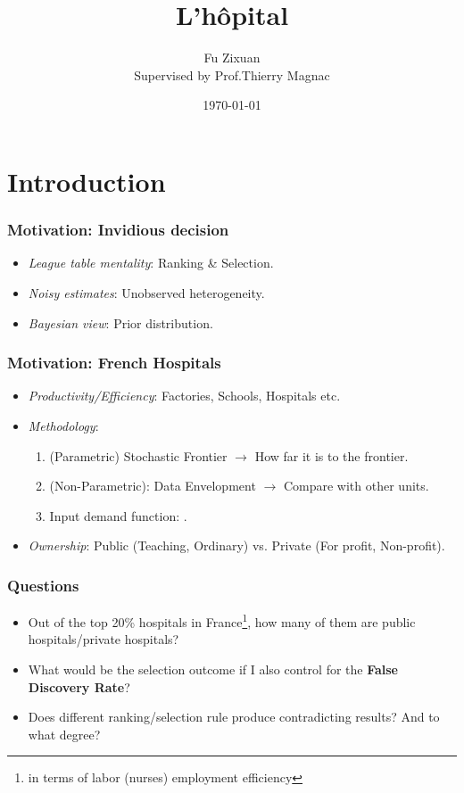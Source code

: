 \documentclass[10pt,mathserif]{beamer}
\title{\large \bfseries L'hôpital}
\author{Fu Zixuan\\[3ex]
  Supervised by Prof.Thierry Magnac}
\date{\today}
\begin{document}
\frame{
  \thispagestyle{empty}
  \titlepage
}

\section{Introduction}

\begin{frame}
  \frametitle{Motivation: Invidious decision}
  \begin{itemize}\itemsep=12pt
    \item \textit{League table mentality}: Ranking \& Selection.
    \item \textit{Noisy estimates}: Unobserved heterogeneity.
    \item \textit{Bayesian view}: Prior distribution.
  \end{itemize}
\end{frame}

\begin{frame}
  \frametitle{Motivation: French Hospitals}
  \begin{itemize}\itemsep=12pt
    \item \textit{Productivity/Efficiency}: Factories, Schools, Hospitals etc.
    \item \textit{Methodology}:
          \begin{enumerate} \vspace*{0.5em}
            \item (Parametric) Stochastic Frontier $\to$ How far it is to the frontier.
            \item (Non-Parametric): Data Envelopment $\to$ Compare with other units.
            \item Input demand function: \cite{croiset2024hospitals}.
          \end{enumerate}
    \item \textit{Ownership}: Public (Teaching, Ordinary) vs. Private (For profit, Non-profit).
  \end{itemize}
\end{frame}

\begin{frame}
  \frametitle{Questions}
  \begin{itemize}\itemsep=12pt
    \item Out of the top 20\% hospitals in France\footnote{in terms of labor (nurses)
            employment efficiency}, how many of them are public hospitals/private
          hospitals?
    \item What would be the selection outcome if I also control for the \textbf{False
            Discovery Rate}?
    \item Does different ranking/selection rule produce contradicting results? And to
          what degree?
  \end{itemize}
\end{frame}
\end{document}
